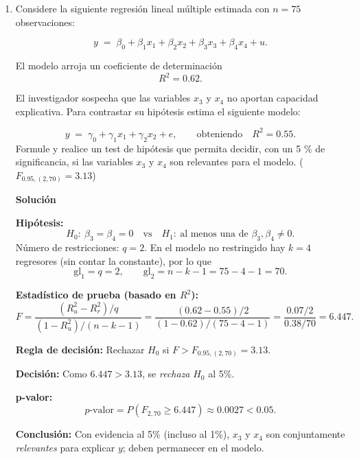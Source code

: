 \documentclass[12pt]{article}
\begin{document}
\begin{enumerate}
{\begin{enumerate}
$$s.e.(\hat{\beta}_1-4\hat{\beta}_3)=\sqrt{\hat{Var}(\hat{\beta}_1-4\hat{\beta}_3)}=\sqrt{\hat{Var}(\hat{\beta}_1)+16\hat{Var}(\hat{\beta}_3)-8\hat{Cov}(\hat{\beta}_1,\hat{\beta}_3)}$$
$$s.e.(\hat{\beta}_1-4\hat{\beta}_3)=\sqrt{2+16\cdot 2-8 \cdot (-2)}=\sqrt{50}$$
por tanto 
$$t = \frac{9-4\cdot2}{7,071}=0.141$$
y con el valor $t_{1-\alpha/2,246}=1.97$. No se rechaza $H_0$.
\end{enumerate}}

\item Considere la siguiente regresión lineal múltiple estimada con \(n = 75\) observaciones:

\[
y \;=\; \beta_{0} + \beta_{1}x_{1} + \beta_{2}x_{2} + \beta_{3}x_{3} + \beta_{4}x_{4} + u.
\]

El modelo arroja un coeficiente de determinación
\[
R^2 = 0.62.
\]

El investigador sospecha que las variables \(x_{3}\) y \(x_{4}\) no aportan capacidad explicativa.  
Para contrastar su hipótesis estima el siguiente modelo:

\[
y \;=\; \gamma_{0} + \gamma_{1}x_{1} + \gamma_{2}x_{2} + e,
\qquad\text{obteniendo}\quad
R^2 = 0.55.
\]
Formule y realice un test de hipótesis que permita decidir, con un 5 \% de significancia, si las variables \(x_{3}\) y \(x_{4}\) son relevantes para el modelo. ($F_{0.95,(2,70)}=3.13$)


{\color{red} \textbf{Solución}

\textbf{Hipótesis:}
\[
H_0:\ \beta_3=\beta_4=0
\quad\text{vs}\quad
H_1:\ \text{al menos una de } \beta_3,\beta_4 \neq 0.
\]
Número de restricciones: $q=2$. En el modelo no restringido hay $k=4$ regresores (sin contar la constante), por lo que
\[
\text{gl}_1=q=2, \qquad \text{gl}_2=n-k-1=75-4-1=70.
\]


\textbf{Estadístico de prueba (basado en $R^2$):}
\[
F=\frac{(R_u^2-R_r^2)/q}{(1-R_u^2)/(n-k-1)}
=\frac{(0.62-0.55)/2}{(1-0.62)/(75-4-1)}
=\frac{0.07/2}{0.38/70}
=6.447.
\]

\medskip
\textbf{Regla de decisión:} Rechazar $H_0$ si $F>F_{0.95,(2,70)}=3.13$.

\medskip
\textbf{Decisión:} Como $6.447>3.13$, se \emph{rechaza} $H_0$ al 5\%.

\medskip
\textbf{p\hbox{-}valor:}
\[
p\text{-valor}=P\!\left(F_{2,70}\ge 6.447\right)\approx 0.0027<0.05.
\]

\medskip
\textbf{Conclusión:} Con evidencia al 5\% (incluso al 1\%), $x_3$ y $x_4$ son conjuntamente \emph{relevantes} para explicar $y$; deben permanecer en el modelo.}
\end{enumerate}
\end{document}
